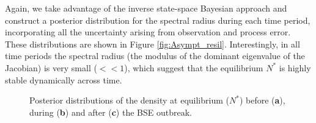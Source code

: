 \documentclass[12pt,a4paper]{article}
\begin{document}
Again, we take advantage of the inverse state-space Bayesian approach and construct a posterior distribution for the spectral radius during each time period, incorporating all the uncertainty arising from observation and process error. These distributions are shown in Figure \ref{fig:Asympt_resil}. Interestingly, in all time periods the spectral radius (the modulus of the dominant eigenvalue of the Jacobian) is very small ($<<1$), which suggest that the equilibrium $N^*$ is highly stable dynamically across time. 

\renewcommand{\thefigure}{S2}
\begin{figure}[htbp]
	\centering
	\qquad
	\qquad
	
	\caption{Posterior distributions of the density at equilibrium ($N^*$) before (\textbf{a}), during (\textbf{b}) and after (\textbf{c}) the BSE outbreak.}%
	\label{fig:Neqs}%
\end{figure}
\end{document}
